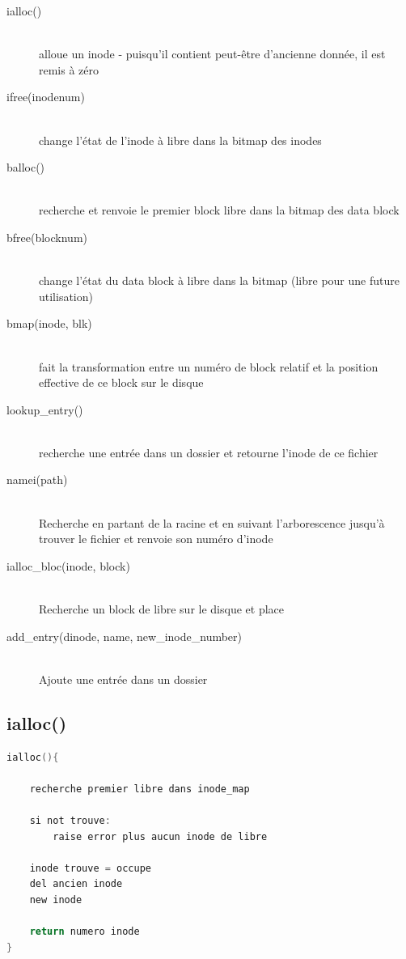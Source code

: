 \documentclass[a4paper,12pt]{article}
\begin{document}
\begin{description}
\item[ialloc()] \hfill \\
	alloue un inode - puisqu'il contient peut-être d'ancienne donnée, il est remis à zéro
\item[ifree(inodenum)] \hfill \\
	change l'état de l'inode à libre dans la bitmap des inodes
\item[balloc()] \hfill \\
	recherche et renvoie le premier block libre dans la bitmap des data block
\item[bfree(blocknum)] \hfill \\
	change l'état du data block à libre dans la bitmap (libre pour une future utilisation)
\item[bmap(inode, blk)] \hfill \\
	fait la transformation entre un numéro de block relatif et la position effective de ce block sur le disque
\item[lookup\_entry()] \hfill \\
	recherche une entrée dans un dossier et retourne l'inode de ce fichier
\item[namei(path)] \hfill \\
	Recherche en partant de la racine et en suivant l'arborescence jusqu'à trouver le fichier et renvoie son numéro d'inode
\item[ialloc\_bloc(inode, block)] \hfill \\
	Recherche un block de libre sur le disque et place 
\item[add\_entry(dinode, name, new\_inode\_number)] \hfill \\
	Ajoute une entrée dans un dossier
\end{description}


\subsection{ialloc()}

\begin{lstlisting}[language=C, caption=pseudo code ialloc()()]
ialloc(){

	recherche premier libre dans inode_map
	
	si not trouve:
		raise error plus aucun inode de libre
	
	inode trouve = occupe
	del ancien inode
	new inode
	
	return numero inode
}
\end{lstlisting}
\end{document}
